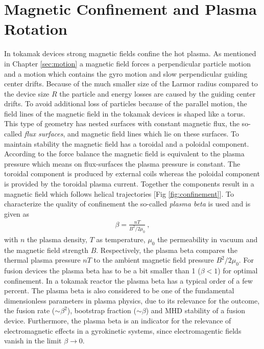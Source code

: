 \newpage
\section{Magnetic Confinement and Plasma Rotation}
\label{sec:confinement}

In tokamak devices strong magnetic fields confine the hot plasma. As mentioned in Chapter \ref{sec:motion} a magnetic field forces a perpendicular particle motion and a motion which contains the gyro motion and slow perpendicular guiding center drifts. Because of the much smaller size of the Larmor radius compared to the device size $R$ the particle and energy losses are caused by the guiding center drifts. To avoid additional loss of particles because of the parallel motion, the field lines of the magnetic field in the tokamak devices is shaped like a torus. This type of geometry has nested surfaces with constant magnetic flux, the so-called \textit{flux surfaces}, and magnetic field lines which lie on these surfaces. To maintain stability the magnetic field has a toroidal and a poloidal component. According to the force balance the magnetic field is equivalent to the plasma pressure which means on flux-surfaces the plasma pressure is constant. \cite{Stroth2018, Wesson2004} The toroidal component is produced by external coils whereas the poloidal component is provided by the toroidal plasma current. Together the components result in a magnetic field which follows helical trajectories [Fig \ref{fig:confinement}]. To characterize the quality of confinement the so-called \textit{plasma beta} is used and is given as
\begin{gather}
    \beta = \frac{nT}{B^2/2\mu_0}~,
\end{gather} 
with $n$ the plasma density, $T$ as temperature, $\mu_0$ the permeability in vacuum and the magnetic field strength $B$. Respectively, the plasma beta compares the thermal plasma pressure $nT$ to the ambient magnetic field pressure $B^2/2\mu_0 $. For fusion devices the plasma beta has to be a bit smaller than 1 ($\beta < 1$) for optimal confinement. In a tokamak reactor the plasma beta has a typical order of a few percent. 
The plasma beta is also considered to be one of the fundamental dimensionless parameters in plasma physics, due to its relevance for the outcome, the fusion rate ($\sim \beta^2$), bootstrap fraction ($\sim \beta$) and MHD stability of a fusion device. Furthermore, the plasma beta is an indicator for the relevance of electromagnetic effects in a gyrokinetic systems, since electromagentic fields vanish in the limit $\beta \rightarrow 0$.  \cite{Crandall_PHD}
\bigskip

